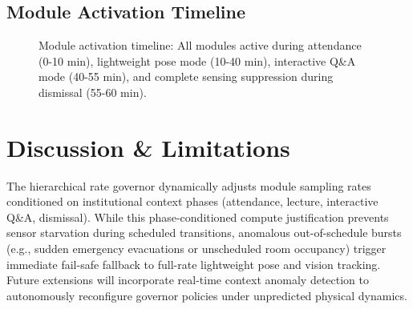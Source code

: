 \documentclass[conference]{IEEEtran}
\begin{document}
\subsection{Module Activation Timeline}
\begin{figure}[htbp]
\centering
{}
\caption{Module activation timeline: All modules active during attendance (0-10 min), lightweight pose mode (10-40 min), interactive Q\&A mode (40-55 min), and complete sensing suppression during dismissal (55-60 min).}
\label{fig:timeline}
\end{figure}

\section{Discussion \& Limitations}
The hierarchical rate governor dynamically adjusts module sampling rates conditioned on institutional context phases (attendance, lecture, interactive Q\&A, dismissal). While this phase-conditioned compute justification prevents sensor starvation during scheduled transitions, anomalous out-of-schedule bursts (e.g., sudden emergency evacuations or unscheduled room occupancy) trigger immediate fail-safe fallback to full-rate lightweight pose and vision tracking. Future extensions will incorporate real-time context anomaly detection to autonomously reconfigure governor policies under unpredicted physical dynamics.
\end{document}
